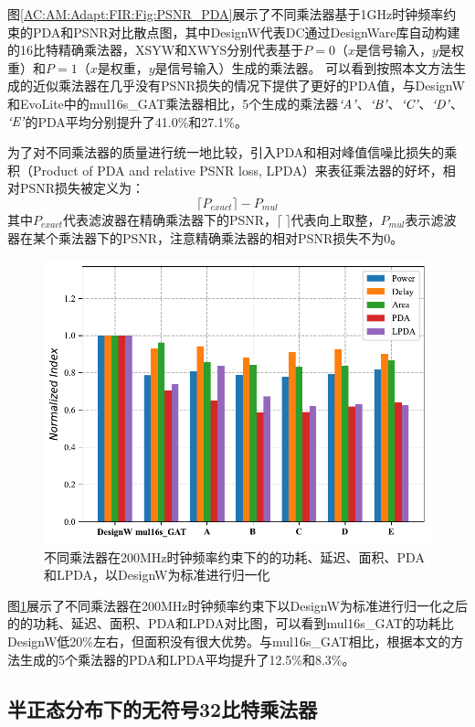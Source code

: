 图\ref{AC:AM:Adapt:FIR:Fig:PSNR_PDA}展示了不同乘法器基于1GHz时钟频率约束的PDA和PSNR对比散点图，其中DesignW代表DC通过DesignWare库\cite{IP:DesignWare}自动构建的16比特精确乘法器，XSYW和XWYS分别代表基于$P=0$（$x$是信号输入，$y$是权重）和$P=1$（$x$是权重，$y$是信号输入）生成的乘法器。
可以看到按照本文方法生成的近似乘法器在几乎没有PSNR损失的情况下提供了更好的PDA值，与DesignW和EvoLite中的mul16s\_GAT乘法器相比，5个生成的乘法器$\emph{`A'}$、$\emph{`B'}$、$\emph{`C'}$、$\emph{`D'}$、$\emph{`E'}$的PDA平均分别提升了41.0\%和27.1\%。

为了对不同乘法器的质量进行统一地比较，引入PDA和相对峰值信噪比损失的乘积（Product of PDA and relative PSNR loss, LPDA）来表征乘法器的好坏，相对PSNR损失被定义为：
\begin{equation}
    \lceil P_{exact} \rceil - P_{mul}
\label{AC:AM:Adapt:FIR:Eq:R_PSNR_Loss}
\end{equation}
其中$P_{exact}$代表滤波器在精确乘法器下的PSNR，$\lceil \ \rceil$代表向上取整，$P_{mul}$表示滤波器在某个乘法器下的PSNR，注意精确乘法器的相对PSNR损失不为0。

\begin{figure}[!ht]
    \centering
    \includegraphics[width=0.8\linewidth]{./figs/AC-AM-Adapt-FIR-hist.pdf}
    \caption{不同乘法器在200MHz时钟频率约束下的的功耗、延迟、面积、PDA和LPDA，以DesignW为标准进行归一化}
    \label{AC:AM:Adapt:FIR:Fig:hist}
\end{figure}

图\ref{AC:AM:Adapt:FIR:Fig:hist}展示了不同乘法器在200MHz时钟频率约束下以DesignW为标准进行归一化之后的的功耗、延迟、面积、PDA和LPDA对比图，可以看到mul16s\_GAT的功耗比DesignW低20\%左右，但面积没有很大优势。与mul16s\_GAT相比，根据本文的方法生成的5个乘法器的PDA和LPDA平均提升了12.5\%和8.3\%。


\subsection{半正态分布下的无符号32比特乘法器}

